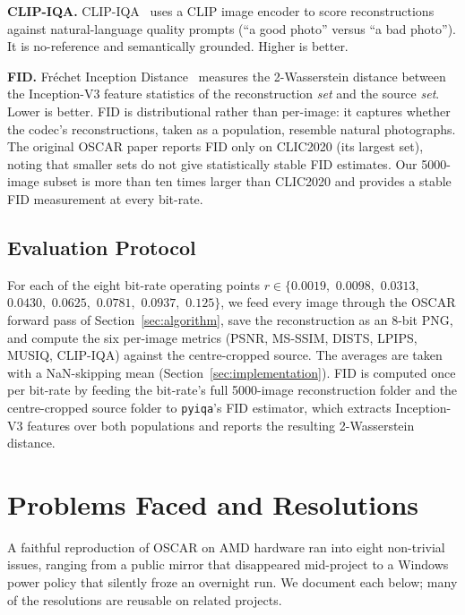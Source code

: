 \documentclass[conference]{IEEEtran}
\begin{document}
\textbf{CLIP-IQA.} CLIP-IQA~\cite{clipiqa} uses a CLIP image encoder to
score reconstructions against natural-language quality prompts (``a good
photo'' versus ``a bad photo''). It is no-reference and semantically
grounded. Higher is better.

\textbf{FID.} Fr\'echet Inception Distance~\cite{fid} measures the
2-Wasserstein distance between the Inception-V3 feature statistics of the
reconstruction \emph{set} and the source \emph{set}. Lower is better. FID is
distributional rather than per-image: it captures whether the codec's
reconstructions, taken as a population, resemble natural photographs. The
original OSCAR paper reports FID only on CLIC2020 (its largest set), noting
that smaller sets do not give statistically stable FID estimates. Our
5000-image subset is more than ten times larger than CLIC2020 and provides a
stable FID measurement at every bit-rate.

\subsection{Evaluation Protocol}

For each of the eight bit-rate operating points $r \in \{0.0019,$ $0.0098,$
$0.0313,$ $0.0430,$ $0.0625,$ $0.0781,$ $0.0937,$ $0.125\}$, we feed every
image through the OSCAR forward pass of Section~\ref{sec:algorithm}, save the
reconstruction as an 8-bit PNG, and compute the six per-image metrics
(PSNR, MS-SSIM, DISTS, LPIPS, MUSIQ, CLIP-IQA) against the centre-cropped
source. The averages are taken with a NaN-skipping mean (Section~\ref{sec:implementation}).
FID is computed once per bit-rate by feeding the bit-rate's full 5000-image
reconstruction folder and the centre-cropped source folder to \texttt{pyiqa}'s
FID estimator, which extracts Inception-V3 features over both populations
and reports the resulting 2-Wasserstein distance.

\section{Problems Faced and Resolutions}
\label{sec:problems}

A faithful reproduction of OSCAR on AMD hardware ran into eight non-trivial
issues, ranging from a public mirror that disappeared mid-project to a
Windows power policy that silently froze an overnight run. We document each
below; many of the resolutions are reusable on related projects.
\end{document}
